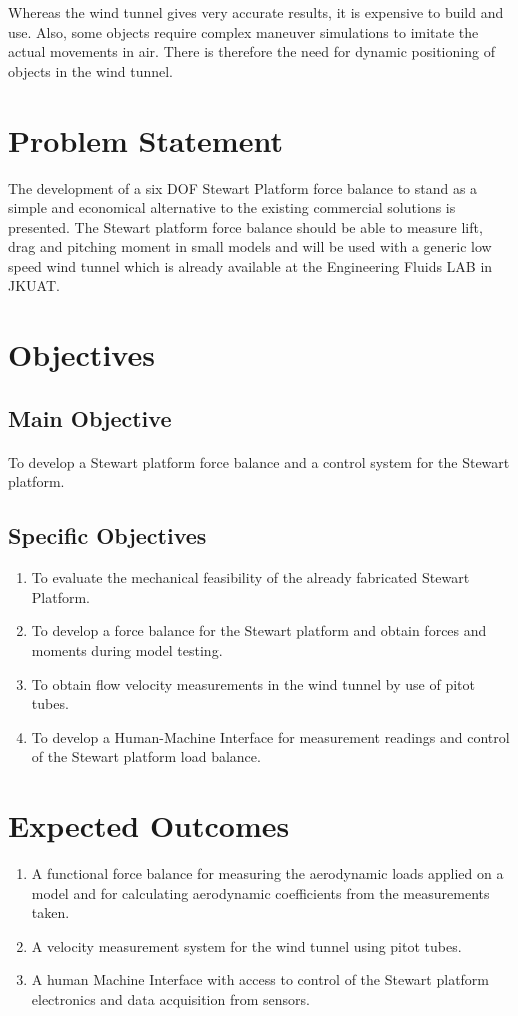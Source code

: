 Whereas the wind tunnel gives very accurate results, it is expensive to build and use. Also, some objects require complex maneuver simulations to imitate the actual movements in air. There is therefore the need for dynamic positioning of objects in the wind tunnel.
\section{Problem Statement}
 The development of a six DOF Stewart Platform force balance to stand as a simple and economical alternative to the existing commercial solutions is presented. The Stewart platform force balance should be able to measure lift, drag and pitching moment in small models and will be used with a generic low speed wind tunnel which is already available at the Engineering Fluids LAB in JKUAT.
\section{Objectives}
\subsection{Main Objective}
\paragraph{} To develop a Stewart platform force balance and a control system for the Stewart platform. 
\subsection{Specific Objectives}
\begin{enumerate}
\item To evaluate the mechanical feasibility of the already fabricated Stewart Platform.
\item To develop a force balance for the Stewart platform and obtain forces and moments during model testing.
\item To obtain flow velocity measurements in the wind tunnel by use of pitot tubes.
\item To develop a Human-Machine Interface for measurement readings and control of the Stewart platform load balance.
\end{enumerate}
\section{Expected Outcomes}
\begin{enumerate}
\item A functional force balance for measuring the aerodynamic loads applied on a model
and for calculating aerodynamic coefficients from the measurements taken.
\item A velocity measurement system for the wind tunnel using pitot tubes.
\item A human Machine Interface with access to control of the Stewart platform electronics
and data acquisition from sensors.
\end{enumerate}
